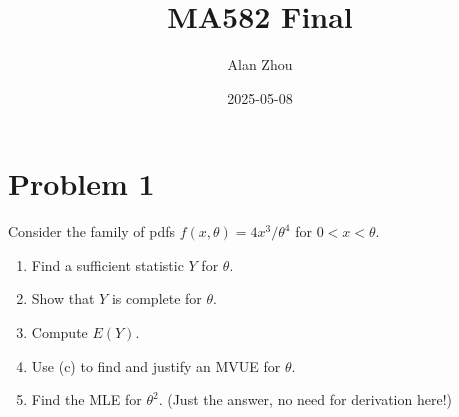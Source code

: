 \documentclass{article}
\title{MA582 Final}
\author{Alan Zhou}
\date{2025-05-08}
\begin{document}
\maketitle


\section*{Problem 1}
Consider the family of pdfs $f(x,\theta) = 4x^3/\theta^4$ for $0 < x < \theta$.
\begin{enumerate}[label=(\alph*)]
\item Find a sufficient statistic $Y$ for $\theta$.
\item Show that $Y$ is complete for $\theta$.
\item Compute $E(Y)$.
\item Use (c) to find and justify an MVUE for $\theta$.
\item Find the MLE for $\theta^2$. (Just the answer, no need for derivation here!)
\end{enumerate}
\end{document}
